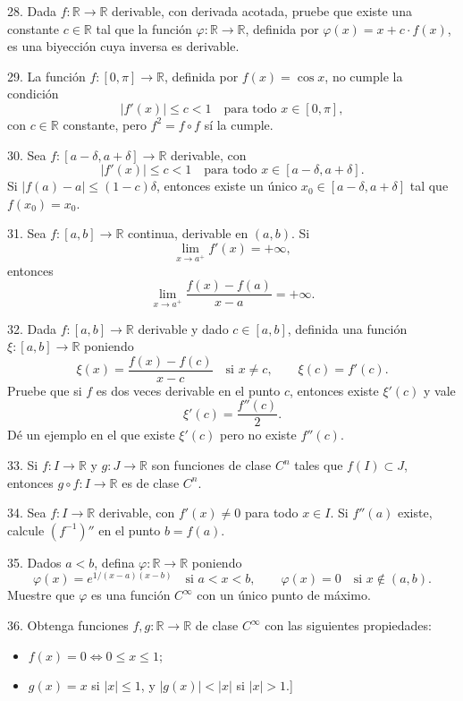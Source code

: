 \documentclass[12pt,oneside]{book}
\begin{document}
28. Dada \( f: \mathbb{R} \to \mathbb{R} \) derivable, con derivada acotada, pruebe que existe una constante \( c \in \mathbb{R} \) tal que la función \( \varphi: \mathbb{R} \to \mathbb{R} \), definida por \( \varphi(x) = x + c \cdot f(x) \), es una biyección cuya inversa es derivable.

29. La función \( f: [0, \pi] \to \mathbb{R} \), definida por \( f(x) = \cos x \), no cumple la condición
\[
|f'(x)| \leq c < 1 \quad \text{para todo } x \in [0, \pi],
\]
con \( c \in \mathbb{R} \) constante, pero \( f^2 = f \circ f \) sí la cumple.

30. Sea \( f: [a - \delta, a + \delta] \to \mathbb{R} \) derivable, con
\[
|f'(x)| \leq c < 1 \quad \text{para todo } x \in [a - \delta, a + \delta].
\]
Si \( |f(a) - a| \leq (1 - c)\delta \), entonces existe un único \( x_0 \in [a - \delta, a + \delta] \) tal que \( f(x_0) = x_0 \).

31. Sea \( f: [a, b] \to \mathbb{R} \) continua, derivable en \( (a, b) \). Si
\[
\lim_{x \to a^+} f'(x) = +\infty,
\]
entonces
\[
\lim_{x \to a^+} \frac{f(x) - f(a)}{x - a} = +\infty.
\]

32. Dada \( f: [a, b] \to \mathbb{R} \) derivable y dado \( c \in [a, b] \), definida una función \( \xi: [a, b] \to \mathbb{R} \) poniendo
\[
\xi(x) = \frac{f(x) - f(c)}{x - c} \quad \text{si } x \neq c, \qquad \xi(c) = f'(c).
\]
Pruebe que si \( f \) es dos veces derivable en el punto \( c \), entonces existe \( \xi'(c) \) y vale
\[
\xi'(c) = \frac{f''(c)}{2}.
\]
Dé un ejemplo en el que existe \( \xi'(c) \) pero no existe \( f''(c) \).

33. Si \( f: I \to \mathbb{R} \) y \( g: J \to \mathbb{R} \) son funciones de clase \( C^n \) tales que \( f(I) \subset J \), entonces \( g \circ f: I \to \mathbb{R} \) es de clase \( C^n \).

34. Sea \( f: I \to \mathbb{R} \) derivable, con \( f'(x) \neq 0 \) para todo \( x \in I \). Si \( f''(a) \) existe, calcule \( (f^{-1})'' \) en el punto \( b = f(a) \).

35. Dados \( a < b \), defina \( \varphi: \mathbb{R} \to \mathbb{R} \) poniendo
\[
\varphi(x) = e^{1/(x-a)(x-b)} \quad \text{si } a < x < b, \qquad \varphi(x) = 0 \quad \text{si } x \notin (a, b).
\]
Muestre que \( \varphi \) es una función \( C^\infty \) con un único punto de máximo.

36. Obtenga funciones \( f, g: \mathbb{R} \to \mathbb{R} \) de clase \( C^\infty \) con las siguientes propiedades:
\begin{itemize}
    \item[i)] \( f(x) = 0 \Leftrightarrow 0 \leq x \leq 1 \);

    \item[ii)] \( g(x) = x \) si \( |x| \leq 1 \), y \( |g(x)| < |x| \) si \( |x| > 1 \).]
\end{itemize}
\end{document}

